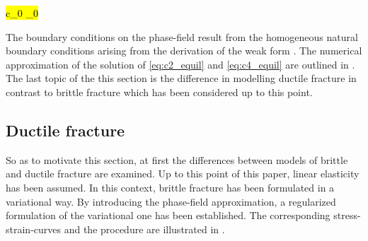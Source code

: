\hl{ c_{0}  _{0} }

The boundary conditions on the phase-field result from the homogeneous natural boundary conditions arising from the derivation of the weak form \citep{11_PF_DissBorden}.\hl{} The numerical approximation of the solution of \eqref{eq:c2_equil} and \eqref{eq:c4_equil} are outlined in . The last topic of the this section is the difference in modelling ductile fracture in contrast to brittle fracture which has been considered up to this point.

\subsection{Ductile fracture} \label{sec:ductile_frac}
So as to motivate this section, at first the differences between models of brittle and ductile fracture are examined. Up to this point of this paper, linear elasticity has been assumed. In this context, brittle fracture has been formulated in a variational way. By introducing the phase-field approximation, a regularized formulation of the variational one has been established. The corresponding stress-strain-curves and the procedure are illustrated in .
